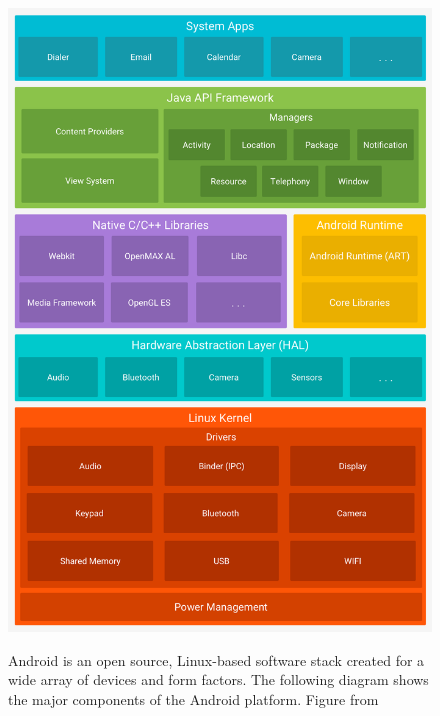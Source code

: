 \begin{figure}[ht]
	\centering
	\includegraphics[width=\textwidth]{images/hello/android-stack.png}
	\label{fig:stack}
	\caption{Android is an open source, Linux-based software stack created for a wide array of devices and form factors. The following diagram shows the major components of the Android platform. Figure from \cite{google2017}}
\end{figure}


